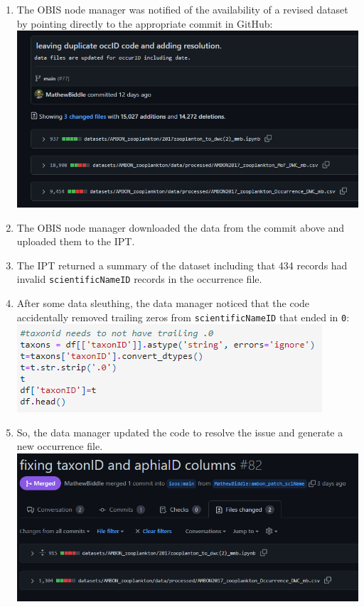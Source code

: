 \documentclass[
]{book}
\begin{document}
\begin{enumerate}
\item
  The OBIS node manager was notified of the availability of a revised dataset by pointing directly to the appropriate
  commit in GitHub:
  \href{https://github.com/ioos/bio_data_guide/commit/ef17f89f23316a6227fdf58de509582bd9854a55}{\includegraphics{./figs/commit_ef17f89.png}}
\item
  The OBIS node manager downloaded the data from the commit above and uploaded them to the IPT.
\item
  The IPT returned a summary of the dataset including that 434 records had invalid \texttt{scientificNameID} records in the
  occurrence file.
\item
  After some data sleuthing, the data manager noticed that the code accidentally removed trailing zeros from
  \texttt{scientificNameID} that ended in \texttt{0}:
  \href{https://nbviewer.org/github/ioos/bio_data_guide/blob/ef17f89f23316a6227fdf58de509582bd9854a55/datasets/AMBON_zooplankton/2017zooplanton_to_dwc\%282\%29_mmb.ipynb\#END-of-ID-generation}{\includegraphics{./figs/code_snippet.png}}
\item
  So, the data manager updated the code to resolve the issue and generate a new occurrence file.
  \href{https://github.com/ioos/bio_data_guide/pull/82}{\includegraphics{./figs/PR_82.png}}


\end{enumerate}
\end{document}
